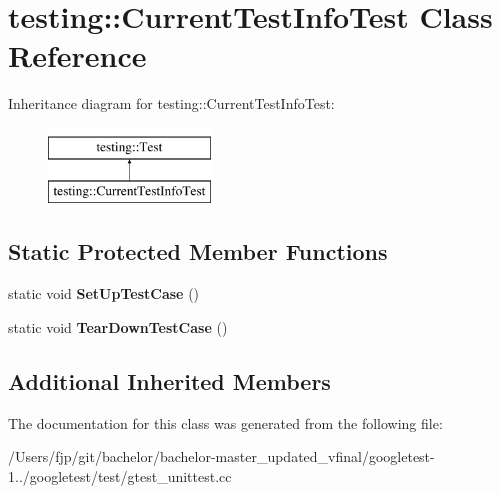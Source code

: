 \hypertarget{classtesting_1_1_current_test_info_test}{}\section{testing\+:\+:Current\+Test\+Info\+Test Class Reference}
\label{classtesting_1_1_current_test_info_test}
Inheritance diagram for testing\+:\+:Current\+Test\+Info\+Test\+:\begin{figure}[H]
\begin{center}
\leavevmode
\includegraphics[height=2.000000cm]{classtesting_1_1_current_test_info_test}
\end{center}
\end{figure}
\subsection*{Static Protected Member Functions}
\begin{DoxyCompactItemize}
\item 
\mbox{\label{classtesting_1_1_current_test_info_test_a61bad7ce29923afd464daf9684b6269e}} 
static void {\bfseries Set\+Up\+Test\+Case} ()
\item 
\mbox{\label{classtesting_1_1_current_test_info_test_a9a80a5a3e6e70c619870c2ae9df892a6}} 
static void {\bfseries Tear\+Down\+Test\+Case} ()
\end{DoxyCompactItemize}
\subsection*{Additional Inherited Members}


The documentation for this class was generated from the following file\+:\begin{DoxyCompactItemize}
\item 
/\+Users/fjp/git/bachelor/bachelor-\/master\+\_\+updated\+\_\+vfinal/googletest-\/1../googletest/test/gtest\+\_\+unittest.\+cc\end{DoxyCompactItemize}
